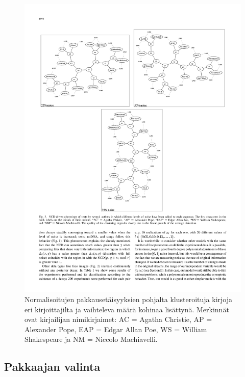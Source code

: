 \documentclass[12pt,finnish]{tktltiki2}
\theoremstyle{definition}
\theoremstyle{remark}
\begin{document}
    \begin{figure}[!htb]
      \includegraphics[width=\textwidth]{img/noise-005}
      \caption{Normalisoitujen pakkausetäisyyksien pohjalta klusteroituja kirjoja eri kirjoittajilta ja vaihteleva määrä kohinaa lisättynä. Merkinnät ovat kirjailijan nimikirjaimet: AC = Agatha Christie, AP = Alexander Pope, EAP = Edgar Allan Poe, WS = William Shakespeare ja NM = Niccolo Machiavelli.
      \cite{4167725}}
      \label{fig:(noise-005)}
    \end{figure}


  \subsection{Pakkaajan valinta} %
  \label{sub:pakkaajan_valinta}
\end{document}
